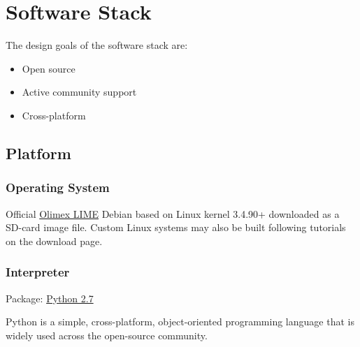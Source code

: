 \usepackage{listings}
\usepackage{color}
\usepackage{tabular}



\section{Software Stack}

The design goals of the software stack are:
\begin{itemize}
\item Open source
\item Active community support
\item Cross-platform
\end{itemize}

\subsection{Platform}
\subsubsection{Operating System}
Official \href{https://www.olimex.com/wiki/A20-OLinuXino-LIME#How_to_generate_boot-able_SD-card_Debian_Linux_image_for_A20-OLinuXino-LIME.3F}{Olimex LIME} Debian based on Linux kernel 3.4.90+ downloaded as a SD-card image file. Custom Linux systems may also be built following tutorials on the download page.

\subsubsection{Interpreter}

Package:	\href{https://www.python.org/downloads/release/python-279/}{Python 2.7}

Python is a simple, cross-platform, object-oriented programming language that is widely used across the open-source community.

